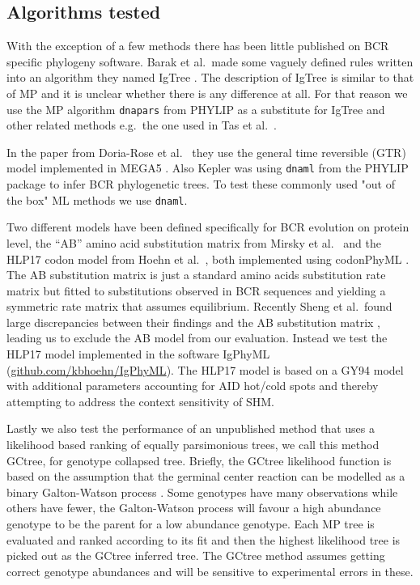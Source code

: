 \subsection{Algorithms tested}
With the exception of a few methods there has been little published on BCR specific phylogeny software.
Barak et al.\ made some vaguely defined rules written into an algorithm they named IgTree \cite{Barak2008-fw}.
The description of IgTree is similar to that of MP and it is unclear whether there is any difference at all.
For that reason we use the MP algorithm \texttt{dnapars} from PHYLIP \cite{plotree1989phylip} as a substitute for IgTree and other related methods e.g.\ the one used in Tas et al.\ \cite{tas2016visualizing}.

In the paper from Doria-Rose et al.\ \cite{Doria-Rose2014-vi} they use the general time reversible (GTR) model implemented in MEGA5 \cite{tamura2011mega5}.
Also Kepler \cite{Kepler2013-sy} was using \texttt{dnaml} from the PHYLIP package to infer BCR phylogenetic trees.
To test these commonly used "out of the box" ML methods we use \texttt{dnaml}.

Two different models have been defined specifically for BCR evolution on protein level, the ``AB'' amino acid substitution matrix from Mirsky et al.\ \cite{mirsky2014antibody} and the HLP17 codon model from Hoehn et al.\ \cite{Hoehn2016-wg}, both implemented using codonPhyML \cite{gil2013codonphyml}.
The AB substitution matrix is just a standard amino acids substitution rate matrix but fitted to substitutions observed in BCR sequences and yielding a symmetric rate matrix that assumes equilibrium.
Recently Sheng et al.\ found large discrepancies between their findings and the AB substitution matrix \cite{sheng2017gene}, leading us to exclude the AB model from our evaluation.
Instead we test the HLP17 model implemented in the software IgPhyML (\url{github.com/kbhoehn/IgPhyML}).
The HLP17 model is based on a GY94 model \cite{goldman1994codon} with additional parameters accounting for AID hot/cold spots and thereby attempting to address the context sensitivity of SHM.

Lastly we also test the performance of an unpublished method that uses a likelihood based ranking of equally parsimonious trees, we call this method GCtree, for genotype collapsed tree.
Briefly, the GCtree likelihood function is based on the assumption that the germinal center reaction can be modelled as a binary Galton-Watson process \cite{harris2002theory}.
Some genotypes have many observations while others have fewer, the Galton-Watson process will favour a high abundance genotype to be the parent for a low abundance genotype.
Each MP tree is evaluated and ranked according to its fit and then the highest likelihood tree is picked out as the GCtree inferred tree.
The GCtree method assumes getting correct genotype abundances and will be sensitive to experimental errors in these.



